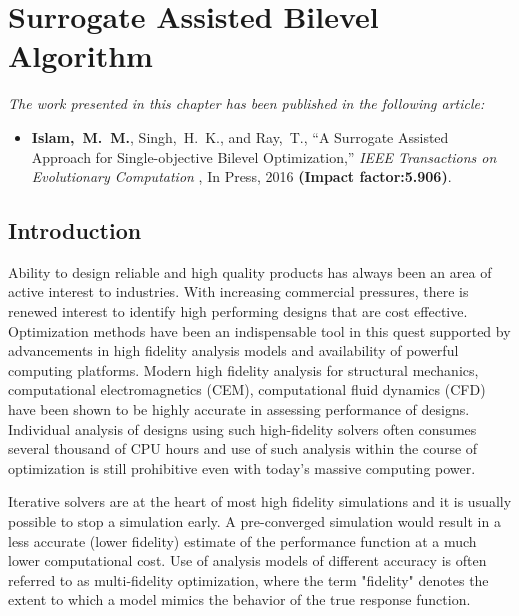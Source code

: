 \chapter{Surrogate Assisted Bilevel Algorithm}
\label{chapter_4_sabla}



\begin{tcolorbox}
\textit{The work presented in this chapter has been published in the following article:}
\small
\begin{itemize}
\item \textbf{Islam,~M.~M.}, {Singh,~H.~K.}, and {Ray,~T.}, ``A Surrogate Assisted Approach for Single-objective Bilevel Optimization,'' {\em IEEE Transactions on Evolutionary Computation }, In Press, 2016 \textbf{(Impact factor:5.906)}.
\end{itemize}
\end{tcolorbox}


\section{Introduction}
Ability to design reliable and high quality products has always been an area of active interest to industries. With
increasing commercial pressures, there is renewed interest to identify high performing designs that are cost effective. Optimization methods have been an indispensable tool in this quest supported by advancements in high fidelity analysis models and availability of powerful computing platforms. Modern high fidelity analysis for structural mechanics, computational electromagnetics (CEM), computational fluid dynamics (CFD) have been shown to be highly accurate in assessing performance of designs. Individual analysis of designs using such high-fidelity solvers often consumes several thousand of CPU hours and use of such analysis within the course of optimization is still prohibitive even with today’s massive computing power.

Iterative solvers are at the heart of most high fidelity simulations and it is usually possible to stop a simulation early. A pre-converged simulation would result in a less accurate (lower fidelity) estimate of the performance function at a much lower computational cost. Use of analysis models of different accuracy is often referred to as multi-fidelity optimization, where the term "fidelity" denotes the extent to which a model mimics the behavior of the true response function.

